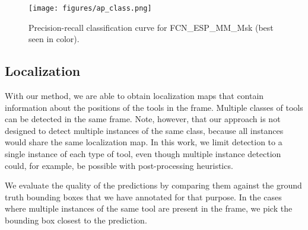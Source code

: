 \documentclass[english,runningheads,a4paper]{llncs}
\begin{document}
\begin{figure}[t]
    \centering
    \texttt{[image: figures/ap\_class.png]}
    \caption{Precision-recall classification curve for FCN\_ESP\_MM\_Msk  (best seen in color).}
    \label{fig:class_ap}
\end{figure}

\subsection{Localization}
With our method, we are able to obtain localization maps that contain information about the positions of the tools in the frame. Multiple classes of tools can be detected in the same frame. Note, however, that our approach is not designed to detect multiple instances of the same class, because all instances would share the same localization map. In this work, we limit detection to a single instance of each type of tool, even though multiple instance detection could, for example, be possible with post-processing heuristics.

We evaluate the quality of the predictions by comparing them against the ground truth bounding boxes that we have annotated for that purpose. In the cases where multiple instances of the same tool are present in the frame, we pick the bounding box closest to the prediction.
\end{document}

